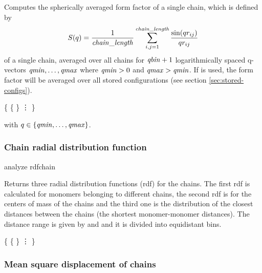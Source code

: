Computes the spherically averaged form factor of a single chain, which
is defined by
\begin{equation}
  S(q) = \frac{1}{\mathrm{\mathit{chain\_length}}} \sum_{i,j=1}^{\mathrm{\mathit{chain\_length}}}
  \frac{\sin(q r_{ij})}{q r_{ij}}
\end{equation}
of a single chain, averaged over all chains for $\mathrm{\mathit{qbin}}+1$
logarithmically spaced q-vectors $\mathrm{\mathit{qmin}}, \dots ,\mathrm{\mathit{qmax}}$ where
$\mathrm{\mathit{qmin}}>0$ and $\mathrm{\mathit{qmax}}>\mathrm{\mathit{qmin}}$.  If  is
used, the form factor will be averaged over all stored configurations
(see section \vref{sec:stored-configs}).


\begin{code}
\{
  \{   \}
  \vdots
\}
\end{code}
with $q \in \{\mathrm{\mathit{qmin}},\dots,\mathrm{\mathit{qmax}}\}$.

\subsubsection{Chain radial distribution function}

\begin{pysyntax}
\end{pysyntax}
\begin{essyntax}
 analyze rdfchain    
\end{essyntax}
Returns three radial distribution functions (rdf) for the chains. The
first rdf is calculated for monomers belonging to different chains,
the second rdf is for the centers of mass of the chains and the third
one is the distribution of the closest distances between the chains
(\ie the shortest monomer-monomer distances). The distance range is
given by  and  and it is divided into
 equidistant bins.

\begin{code}
\{ 
  \{    \}
  \vdots
\}
\end{code}

\subsubsection{Mean square displacement of chains}
\label{analyze:<g1>}
\label{analyze:<g2>}
\label{analyze:<g3>}
\label{analyze:g123}

